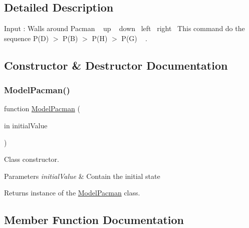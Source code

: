 \subsection{Detailed Description}
Input \+: Walls around Pacman ~ up ~ down~ left~ right~\newline
This command do the sequence P(\+D) $>$ P(\+B) $>$ P(\+H) $>$ P(\+G) ~\newline
. 

\subsection{Constructor \& Destructor Documentation}
\mbox{\label{class_model_pacman_aeece945de8fe29ca408290f87392ac3d}} 
\subsubsection{\texorpdfstring{Model\+Pacman()}{ModelPacman()}}
{\footnotesize\ttfamily function \hyperlink{class_model_pacman}{Model\+Pacman} (\begin{DoxyParamCaption}\item[{in}]{initial\+Value }\end{DoxyParamCaption})}



Class constructor. 


\begin{DoxyParams}{Parameters}
{\em initial\+Value} & Contain the initial state \\
\hline
\end{DoxyParams}
\begin{DoxyReturn}{Returns}
instance of the \hyperlink{class_model_pacman}{Model\+Pacman} class. 
\end{DoxyReturn}


\subsection{Member Function Documentation}
\mbox{\label{class_model_pacman_a6f3b146c92a207e95690d08975e1e072}} 
